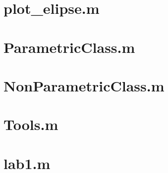 \label{cha:code}

\section{plot_elipse.m}

\section{ParametricClass.m}

\section{NonParametricClass.m}

\section{Tools.m}

\section{lab1.m}